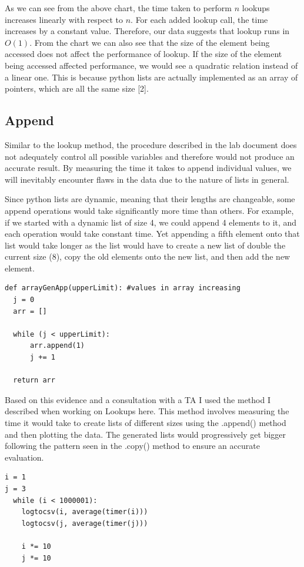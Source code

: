 \documentclass[12pt]{article}
\begin{document}
As we can see from the above chart, the time taken to perform $n$ lookups increases linearly with respect to $n$. For each added lookup call, the time increases by a constant value. Therefore, our data suggests that lookup runs in $O(1)$. From the chart we can also see that the size of the element being accessed does not affect the performance of lookup. If the size of the element being accessed affected performance, we would see a quadratic relation instead of a linear one. This is because python lists are actually implemented as an array of pointers, which are all the same size [2].

\subsection{Append}

Similar to the lookup method, the procedure described in the lab document does not adequately control all possible variables and therefore would not produce an accurate result. By measuring the time it takes to append individual values, we will inevitably encounter flaws in the data due to the nature of lists in general. 

Since python lists are dynamic, meaning that their lengths are changeable, some append operations would take significantly more time than others. For example, if we started with a dynamic list of size 4, we could append 4 elements to it, and each operation would take constant time. Yet appending a fifth element onto that list would take longer as the list would have to create a new list of double the current size (8), copy the old elements onto the new list, and then add the new element. 

\footnotesize
\begin{verbatim}
def arrayGenApp(upperLimit): #values in array increasing
  j = 0
  arr = []
  
  while (j < upperLimit):
      arr.append(1)
      j += 1

  return arr
\end{verbatim}
\normalsize

Based on this evidence and a consultation with a TA I used the method I described when working on Lookups here. This method involves measuring the time it would take to create lists of different sizes using the .append() method and then plotting the data. The generated lists would progressively get bigger following the pattern seen in the .copy() method to ensure an accurate evaluation.

\footnotesize
\begin{verbatim}
i = 1
j = 3
  while (i < 1000001):
    logtocsv(i, average(timer(i)))
    logtocsv(j, average(timer(j)))
    
    i *= 10
    j *= 10
\end{verbatim}
\normalsize
\end{document}
